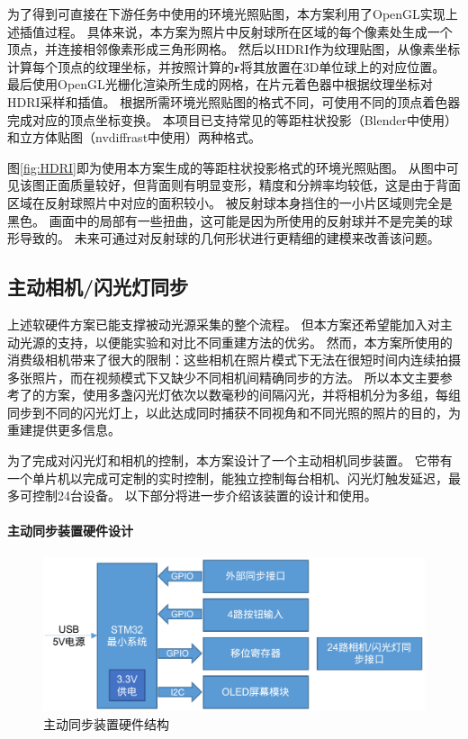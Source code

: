 为了得到可直接在下游任务中使用的环境光照贴图，本方案利用了OpenGL实现上述插值过程。
具体来说，本方案为照片中反射球所在区域的每个像素处生成一个顶点，并连接相邻像素形成三角形网格。
然后以HDRI作为纹理贴图，从像素坐标计算每个顶点的纹理坐标，并按照计算的$\mathbf{r}$将其放置在3D单位球上的对应位置。
最后使用OpenGL光栅化渲染所生成的网格，在片元着色器中根据纹理坐标对HDRI采样和插值。
根据所需环境光照贴图的格式不同，可使用不同的顶点着色器完成对应的顶点坐标变换。
本项目已支持常见的等距柱状投影（Blender中使用）和立方体贴图（nvdiffrast中使用）两种格式。

图\ref{fig:HDRI}即为使用本方案生成的等距柱状投影格式的环境光照贴图。
从图中可见该图正面质量较好，但背面则有明显变形，精度和分辨率均较低，这是由于背面区域在反射球照片中对应的面积较小。
被反射球本身挡住的一小片区域则完全是黑色。
画面中的局部有一些扭曲，这可能是因为所使用的反射球并不是完美的球形导致的。
未来可通过对反射球的几何形状进行更精细的建模来改善该问题。

\subsection{主动相机/闪光灯同步}

上述软硬件方案已能支撑被动光源采集的整个流程。
但本方案还希望能加入对主动光源的支持，以便能实验和对比不同重建方法的优劣。
然而，本方案所使用的消费级相机带来了很大的限制：这些相机在照片模式下无法在很短时间内连续拍摄多张照片，而在视频模式下又缺少不同相机间精确同步的方法。
所以本文主要参考了\citet{FyffeGTGD16}的方案，使用多盏闪光灯依次以数毫秒的间隔闪光，并将相机分为多组，每组同步到不同的闪光灯上，以此达成同时捕获不同视角和不同光照的照片的目的，为重建提供更多信息。

为了完成对闪光灯和相机的控制，本方案设计了一个主动相机同步装置。
它带有一个单片机以完成可定制的实时控制，能独立控制每台相机、闪光灯触发延迟，最多可控制24台设备。
以下部分将进一步介绍该装置的设计和使用。

\paragraph{主动同步装置硬件设计}

\begin{figure}
\centering
\includegraphics[width=0.8\linewidth]{figures/active_sync.png}
\caption{主动同步装置硬件结构}
\label{fig:active_sync}
\end{figure}


